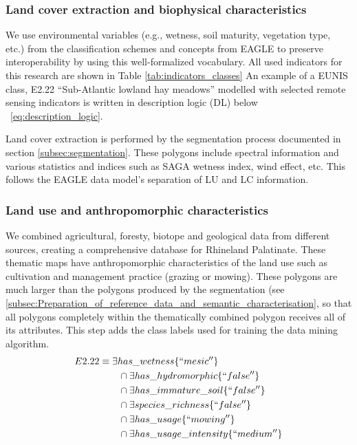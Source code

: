 \documentclass[authoryear, review,12pt,number]{elsarticle}
\begin{document}
\subsubsection{Land cover extraction and biophysical characteristics}
\label{subsec:LC_biophysical}
We use environmental variables (e.g., wetness, soil maturity, vegetation type,
etc.) from the classification schemes and concepts from EAGLE to preserve
interoperability by using this well-formalized vocabulary. All used indicators
for this research are shown in Table \ref{tab:indicators_classes} An example of
a EUNIS class, E2.22 ``Sub-Atlantic lowland hay meadows'' modelled with selected
remote sensing indicators is written in description logic (DL) below
~\ref{eq:description_logic}.

Land cover extraction is performed by the segmentation process documented in 
section \ref{subsec:segmentation}.  These polygons include spectral information 
and various statistics and indices such as SAGA wetness index, wind effect, 
etc. This follows the EAGLE data model's separation of LU and LC information.

\subsubsection{Land use and anthropomorphic characteristics}
\label{subsec:LU_anthropomorphic}
We combined agricultural, foresty, biotope and geological data from different
sources, creating a comprehensive database for Rhineland Palatinate. These
thematic maps have anthropomorphic characteristics of the land use such as
cultivation and management practice (grazing or mowing). These polygons are much
larger than the polygons produced by the segmentation (see
\ref{subsec:Preparation_of_reference_data_and_semantic_characterisation}, so
that all polygons completely within the thematically combined polygon receives
all of its attributes. This step adds the class labels used for training the
data mining algorithm. 
\begin{equation}
\begin{align*}
E2.22 &\equiv \exists has\_wetness \{``mesic''\} \\
&\qquad {} \cap \exists has\_hydromorphic \{``false''\} \\
&\qquad {} \cap \exists has\_immature\_soil \{``false''\} \\
&\qquad {} \cap \exists species\_richness \{``false''\} \\
&\qquad {} \cap \exists has\_usage \{``mowing''\} \\
&\qquad {} \cap \exists has\_usage\_intensity \{``medium''\} \\
\end{align*}
\label{eq:description_logic}
\end{equation}
\label{subsec:Selection_of_training_validation_data}
\end{document}
